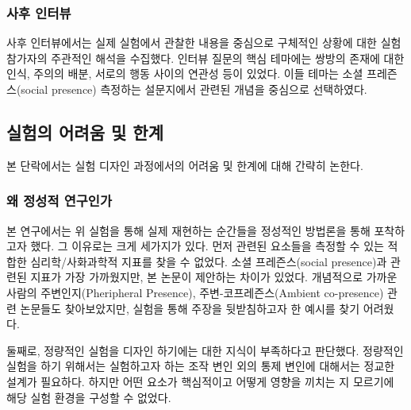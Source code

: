 \subsubsection{사후 인터뷰}

사후 인터뷰에서는 실제 실험에서 관찰한 내용을 중심으로 구체적인 상황에 대한 실험 참가자의 주관적인 해석을 수집했다. 인터뷰 질문의 핵심 테마에는 쌍방의 존재에 대한 인식, 주의의 배분, 서로의 행동 사이의 연관성 등이 있었다. 이들 테마는 소셜 프레즌스(social presence) 측정하는 설문지\cite{biocca2001networked}에서  관련된 개념을 중심으로 선택하였다.


\subsection{실험의 어려움 및 한계}


본 단락에서는 실험 디자인 과정에서의 어려움 및 한계에 대해 간략히 논한다.


\subsubsection{왜 정성적 연구인가}

본 연구에서는 위 실험을 통해 \sysname\이 실제 \concept\를 재현하는 순간들을 정성적인 방법론을 통해 포착하고자 했다. 그 이유로는 크게 세가지가 있다. 먼저  관련된 요소들을 측정할 수 있는 적합한 심리학/사화과학적 지표를 찾을 수 없었다. 소셜 프레즌스(social presence)과 관련된 지표\cite{biocca2001networked}가 가장 가까웠지만, 본 논문이 제안하는  차이가 있었다. 개념적으로 가까운 사람의 주변인지(Pheripheral Presence), 주변-코프레즌스(Ambient co-presence) 관련 논문들도 찾아보았지만, 실험을 통해 주장을 뒷받침하고자 한 예시를 찾기 어려웠다.

둘째로, 정량적인 실험을 디자인 하기에는  대한 지식이 부족하다고 판단했다. 정량적인 실험을 하기 위해서는 실험하고자 하는 조작 변인 외의 통제 변인에 대해서는 정교한 설계가 필요하다. 하지만 어떤 요소가 핵심적이고  어떻게 영향을 끼치는 지 모르기에 해당 실험 환경을 구성할 수 없었다.

